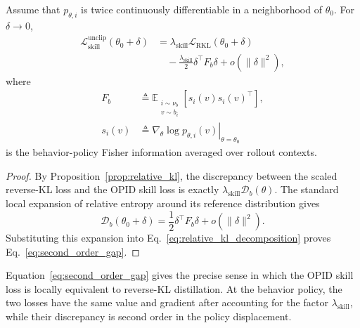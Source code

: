 \documentclass{llmxive}
\begin{document}
\begin{corollary}
\label{cor:first_order_tightness}
Assume that \(p_{\theta,i}\) is twice continuously differentiable in a
neighborhood of \(\theta_0\). For \(\delta\to0\),
\begin{equation}
\begin{aligned}
 \mathcal L_{\mathrm{skill}}^{\mathrm{unclip}}
 (\theta_0+\delta)
 &=
 \lambda_{\mathrm{skill}}
 \mathcal L_{\mathrm{RKL}}(\theta_0+\delta)
 \\
 &\quad-
 \frac{\lambda_{\mathrm{skill}}}{2}
 \delta^\top F_b\delta
 +
 o(\|\delta\|^2),
\end{aligned}
\label{eq:second_order_gap}
\end{equation}
where
\begin{equation*}
\begin{aligned}
 F_b
 &\triangleq
 \mathbb E_{\substack{i\sim\nu_b\\v\sim b_i}}
 \left[
   s_i(v)s_i(v)^\top
 \right],
 \\
 s_i(v)
 &\triangleq
 \left.
 \nabla_\theta\log p_{\theta,i}(v)
 \right|_{\theta=\theta_0}
\end{aligned}
\end{equation*}
is the behavior-policy Fisher information averaged over rollout contexts.
\end{corollary}


\begin{proof}
By Proposition~\ref{prop:relative_kl}, the discrepancy between the scaled
reverse-KL loss and the OPID skill loss is exactly
\(\lambda_{\mathrm{skill}}\mathcal D_b(\theta)\). The standard local
expansion of relative entropy around its reference distribution gives
\begin{equation*}
 \mathcal D_b(\theta_0+\delta)
 =
 \frac12
 \delta^\top F_b\delta
 +
 o(\|\delta\|^2).
\end{equation*}
Substituting this expansion into
Eq.~\ref{eq:relative_kl_decomposition} proves
Eq.~\ref{eq:second_order_gap}.
\end{proof}

Equation~\ref{eq:second_order_gap} gives the precise sense in which the
OPID skill loss is locally equivalent to reverse-KL distillation. At the
behavior policy, the two losses have the same value and gradient after
accounting for the factor \(\lambda_{\mathrm{skill}}\), while their
discrepancy is second order in the policy displacement.
\end{document}
